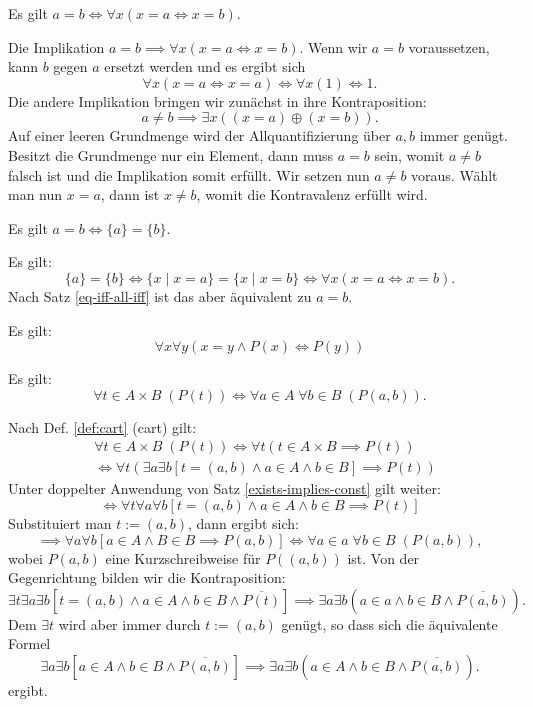 \begin{Satz}\label{eq-iff-all-iff}
Es gilt $a=b\iff \forall x(x=a\iff x=b)$.
\end{Satz}

\begin{Beweis}
Die Implikation $a=b\implies\forall x(x=a\iff x=b)$.
Wenn wir $a=b$ voraussetzen, kann $b$ gegen $a$ ersetzt werden
und es ergibt sich
\[\forall x(x=a\iff x=a)\iff\forall x(1)\iff 1.\]
Die andere Implikation bringen wir zunächst in ihre Kontraposition:
\[a\ne b\implies \exists x((x=a)\oplus (x=b)).\]
Auf einer leeren Grundmenge wird der Allquantifizierung
über $a,b$ immer genügt. Besitzt die Grundmenge nur ein Element,
dann muss $a=b$ sein, womit $a\ne b$ falsch ist und die Implikation
somit erfüllt. Wir setzen nun $a\ne b$ voraus. Wählt man nun
$x=a$, dann ist $x\ne b$, womit die Kontravalenz erfüllt wird.\;\qedsymbol
\end{Beweis}

\begin{Satz}
Es gilt $a=b\iff\{a\}=\{b\}$.
\end{Satz}

\begin{Beweis}
Es gilt:
\[\{a\}=\{b\}\iff \{x\mid x=a\}=\{x\mid x=b\}\iff \forall x(x=a\iff x=b).\]
Nach Satz \ref{eq-iff-all-iff} ist das aber äquivalent zu $a=b$.\;\qedsymbol
\end{Beweis}

\begin{Satz}\label{eq-substitution}
Es gilt:
\[\forall x\forall y(x=y\land P(x)\iff P(y))\]
\end{Satz}

\begin{Satz}\label{all-cart}
Es gilt:
\[\forall t{\in}A{\times}B\;(P(t)) \iff \forall a{\in}A\;\forall b{\in}B\;(P(a,b)).\]
\end{Satz}

\begin{Beweis}
Nach Def. \ref{def:cart} (cart) gilt:
\begin{align*}
&\forall t{\in}A{\times}B\;(P(t))\iff \forall t(t\in A\times B\implies P(t))\\
&\iff \forall t(\exists a\exists b[t=(a,b)\land a\in A\land b\in B]\implies P(t))
\end{align*}
Unter doppelter Anwendung von Satz \ref{exists-implies-const} gilt weiter:
\[\iff \forall t\forall a\forall b[t=(a,b)\land a\in A\land b\in B\implies P(t)]\]
Substituiert man $t:=(a,b)$, dann ergibt sich:
\[\implies \forall a\forall b[a\in A\land B\in B\implies P(a,b)]
\iff \forall a{\in}a\;\forall b{\in}B\;(P(a,b)),\]
wobei $P(a,b)$ eine Kurzschreibweise für $P((a,b))$ ist.
Von der Gegenrichtung bilden wir die Kontraposition:
\[\exists t\exists a\exists b[t=(a,b)\land a\in A\land b\in B\land \overline{P(t)}]
\implies \exists a\exists b(a\in a\land b\in B\land \overline{P(a,b)}).\]
Dem $\exists t$ wird aber immer durch $t:=(a,b)$ genügt, so dass sich die
äquivalente Formel
\[\exists a\exists b[a\in A\land b\in B\land \overline{P(a,b)}]
\implies \exists a\exists b(a\in A\land b\in B\land \overline{P(a,b)}).\]
ergibt.\;\qedsymbol
\end{Beweis}

